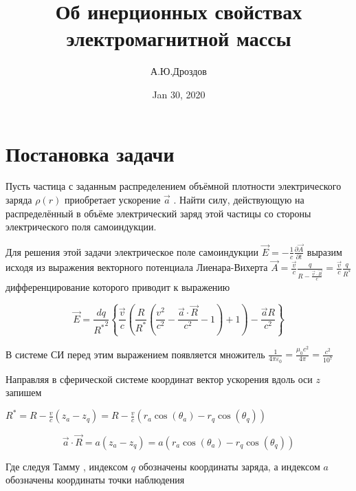 \documentclass{article}
\begin{document}
\title{Об инерционных свойствах электромагнитной массы}

\author{А.Ю.Дроздов}

\date{Jan 30, 2020}



\section{Постановка задачи}



Пусть частица с заданным распределением объёмной плотности электрического заряда $\rho \left( r \right)$ приобретает ускорение $\overrightarrow{a}$ . Найти силу, действующую на распределённый в объёме электрический заряд этой частицы со стороны электрического поля самоиндукции.

Для решения этой задачи электрическое поле самоиндукции $\overrightarrow{E}=-\frac{1}{c}\frac{\partial \overrightarrow{A}}{\partial t}$
выразим исходя из выражения векторного потенциала Лиенара-Вихерта \cite{LL2} $\overrightarrow{A}=\frac{\overrightarrow{v}}{c}\frac{q}{R-\frac{\overrightarrow{v}\cdot \overrightarrow{R}}{c}}=\frac{\overrightarrow{v}}{c}\frac{q}{{{R}^{*}}}$ дифференцирование которого приводит к выражению \cite{rustot}

\[\overrightarrow{E}=\frac{dq}{{{R}^{*}}^{2}}\left\{ \frac{\overrightarrow{v}}{c}\left( \frac{R}{{{R}^{*}}}\left( \frac{{{v}^{2}}}{{{c}^{2}}}-\frac{\overrightarrow{a}\cdot \overrightarrow{R}}{{{c}^{2}}}-1 \right)+1 \right)-\frac{\overrightarrow{a}R}{{{c}^{2}}} \right\}\]

В системе СИ перед этим выражением появляется множитель $\frac{1}{4\pi {{\varepsilon }_{0}}}=\frac{{{\mu }_{0}}{{c}^{2}}}{4\pi }=\frac{{{c}^{2}}}{{{10}^{7}}}$

Направляя в сферической системе координат вектор ускорения вдоль оси $z$  запишем

${{R}^{*}}=R-\frac{v}{c}\left( {{z}_{a}}-{{z}_{q}} \right)=R-\frac{v}{c}\left( {{r}_{a}}\cos \left( {{\theta }_{a}} \right)-{{r}_{q}}\cos \left( {{\theta }_{q}} \right) \right)$

\[\overrightarrow{a}\cdot \overrightarrow{R}=a\left( {{z}_{a}}-{{z}_{q}} \right)=a\left( {{r}_{a}}\cos \left( {{\theta }_{a}} \right)-{{r}_{q}}\cos \left( {{\theta }_{q}} \right) \right)\]

Где следуя Тамму \cite{tamm}, индексом $q$ обозначены координаты заряда, а индексом $a$ обозначены координаты точки наблюдения
\end{document}

